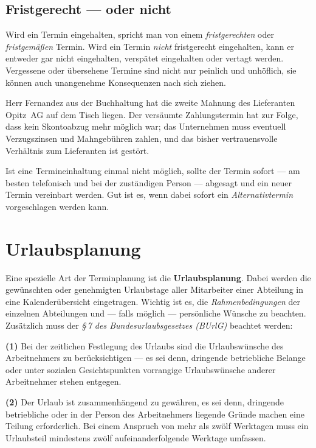 \documentclass[11pt, a4paper]{article}
\begin{document}
\subsection{Fristgerecht --- oder nicht}

Wird ein Termin eingehalten, spricht man von einem \emph{fristgerechten} oder
\emph{fristgemäßen} Termin. Wird ein Termin \emph{nicht} fristgerecht eingehalten, kann
er entweder gar nicht eingehalten, verspätet eingehalten oder vertagt werden. Vergessene
oder übersehene Termine sind nicht nur peinlich und unhöflich, sie können auch
unangenehme Konsequenzen nach sich ziehen.

\begin{beispiel}
Herr Fernandez aus der Buchhaltung hat die zweite Mahnung des Lieferanten Opitz~AG auf
dem Tisch liegen. Der versäumte Zahlungstermin hat zur Folge, dass kein Skontoabzug mehr
möglich war; das Unternehmen muss eventuell Verzugszinsen und Mahngebühren zahlen, und
das bisher vertrauensvolle Verhältnis zum Lieferanten ist gestört.
\end{beispiel}

Ist eine Termineinhaltung einmal nicht möglich, sollte der Termin sofort --- am besten
telefonisch und bei der zuständigen Person --- abgesagt und ein neuer Termin vereinbart
werden. Gut ist es, wenn dabei sofort ein \emph{Alternativtermin} vorgeschlagen werden
kann.

\section{Urlaubsplanung}

Eine spezielle Art der Terminplanung ist die \textbf{Urlaubsplanung}. Dabei werden die
gewünschten oder genehmigten Urlaubstage aller Mitarbeiter einer Abteilung in eine
Kalenderübersicht eingetragen. Wichtig ist es, die \emph{Rahmenbedingungen} der
einzelnen Abteilungen und --- falls möglich --- persönliche Wünsche zu beachten.
Zusätzlich muss der \emph{§\,7 des Bundesurlaubsgesetzes (BUrlG)} beachtet werden:

\begin{merksatz}[title={\bfseries §\,7 BUrlG (Kernaussagen)}]
\textbf{(1)} Bei der zeitlichen Festlegung des Urlaubs sind die Urlaubswünsche des
Arbeitnehmers zu berücksichtigen --- es sei denn, dringende betriebliche Belange oder
unter sozialen Gesichtspunkten vorrangige Urlaubswünsche anderer Arbeitnehmer stehen
entgegen.\par\smallskip
\textbf{(2)} Der Urlaub ist zusammenhängend zu gewähren, es sei denn, dringende
betriebliche oder in der Person des Arbeitnehmers liegende Gründe machen eine Teilung
erforderlich. Bei einem Anspruch von mehr als zwölf Werktagen muss ein Urlaubsteil
mindestens zwölf aufeinanderfolgende Werktage umfassen.
\end{merksatz}
\end{document}
